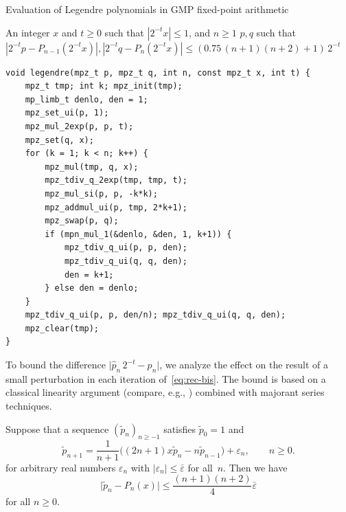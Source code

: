 \documentclass[nohypdvips,review]{siamart0216}
\newcommand{\abs}[1]{\mathopen| #1 \mathclose|}
\begin{document}
\begin{algorithm}[h!]
  \caption{Evaluation of Legendre polynomials in GMP fixed-point arithmetic}
  \small
  \label{alg:gmprec}
  \begin{algorithmic}[1]
    \Require An integer $x$ and $t \ge 0$ such that $|2^{-t} x| \le 1$, and $n \ge 1$
    \Ensure $p, q$ such that $|2^{-t} p - P_{n-1}(2^{-t} x)|, |2^{-t} q - P_{n}(2^{-t} x)| \le (0.75 \, (n+1)(n+2) + 1) \, 2^{-t}$
  \end{algorithmic}
\begin{verbatim}
void legendre(mpz_t p, mpz_t q, int n, const mpz_t x, int t) {
    mpz_t tmp; int k; mpz_init(tmp);
    mp_limb_t denlo, den = 1;
    mpz_set_ui(p, 1);
    mpz_mul_2exp(p, p, t);
    mpz_set(q, x);
    for (k = 1; k < n; k++) {
        mpz_mul(tmp, q, x);
        mpz_tdiv_q_2exp(tmp, tmp, t);
        mpz_mul_si(p, p, -k*k);
        mpz_addmul_ui(p, tmp, 2*k+1);
        mpz_swap(p, q);
        if (mpn_mul_1(&denlo, &den, 1, k+1)) {
            mpz_tdiv_q_ui(p, p, den);
            mpz_tdiv_q_ui(q, q, den);
            den = k+1;
        } else den = denlo;
    }
    mpz_tdiv_q_ui(p, p, den/n); mpz_tdiv_q_ui(q, q, den);
    mpz_clear(tmp);
}
\end{verbatim}
\end{algorithm}

To bound the difference $\abs{\hat p_n \, 2^{-t} - p_n}$, we analyze
the effect on the result of a small perturbation in each iteration
of \cref{eq:rec-bis}.
The bound is based on a classical linearity argument (compare, e.g.,
\cite{Wimp1984}) combined with majorant series techniques.

\begin{proposition} \label{prop:rec-error}
Suppose that a sequence $(\tilde p_n)_{n \geq -1}$ satisfies
$\tilde p_0 = 1$ and
\begin{equation} \label{eq:rec-pert}
  \tilde{p}_{n + 1} =
    \frac{1}{n+1}
    \bigl( (2n +1) x \tilde{p}_n - n \tilde{p}_{n-1} \bigr)
    + \varepsilon_n,
  \qquad n \geq 0.
\end{equation}
for arbitrary real numbers $\varepsilon_n$
with $\abs{\varepsilon_n} \leq \bar\varepsilon$ for all $n$.
Then we have
\[
  \abs{\tilde p_n  - P_n(x)}
  \leq \frac{(n+1)(n+2)}{4} \bar \varepsilon
\]
for all $n \geq 0$.
\end{proposition}
\end{document}
